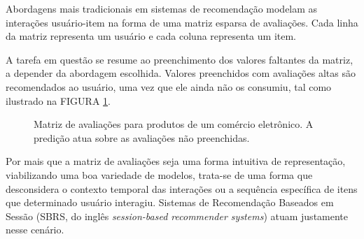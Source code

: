 Abordagens mais tradicionais em sistemas de recomendação modelam as interações
usuário-item na forma de uma matriz esparsa de avaliações. Cada linha da matriz
representa um usuário e cada coluna representa um item.

A tarefa em questão se
resume ao preenchimento dos valores faltantes da matriz, a depender da
abordagem escolhida. Valores preenchidos com avaliações altas são recomendados
ao usuário, uma vez que ele ainda não os consumiu, tal como ilustrado
na FIGURA \ref{fig:matriz_15}.


\begin{figure}[h]
    \centering
      \caption{Matriz de avaliações para produtos de um comércio eletrônico. A predição atua sobre as avaliações não preenchidas.}
      \label{fig:matriz_15}
\end{figure}

Por mais que a matriz de avaliações seja uma forma intuitiva de representação,
viabilizando uma boa variedade de modelos, trata-se de uma forma que
desconsidera o contexto temporal das interações ou a sequência específica de
itens que determinado usuário interagiu. Sistemas de Recomendação Baseados em
Sessão (SBRS, do inglês \textit{session-based recommender systems}) atuam
justamente nesse cenário.


